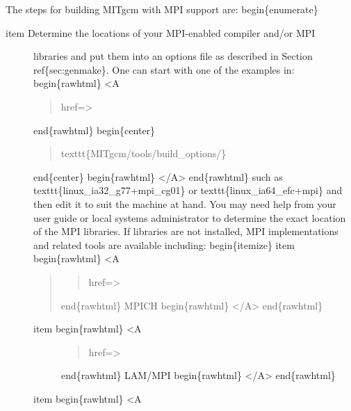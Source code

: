 \documentclass[letterpaper,10pt,english]{sphinxmanual}
\begin{document}
The steps for building MITgcm with MPI support are:
begin\{enumerate\}
\begin{description}
\item[{item Determine the locations of your MPI-enabled compiler and/or MPI}] \leavevmode
libraries and put them into an options file as described in Section
ref\{sec:genmake\}.  One can start with one of the examples in:
begin\{rawhtml\} \textless{}A
\begin{quote}

href=\sphinxquotedblright{}\sphinxquotedblleft{}\textgreater{}
\end{quote}

end\{rawhtml\}
begin\{center\}
\begin{quote}

texttt\{MITgcm/tools/build\_options/\}
\end{quote}

end\{center\}
begin\{rawhtml\} \textless{}/A\textgreater{} end\{rawhtml\}
such as texttt\{linux\_ia32\_g77+mpi\_cg01\} or
texttt\{linux\_ia64\_efc+mpi\} and then edit it to suit the machine at
hand.  You may need help from your user guide or local systems
administrator to determine the exact location of the MPI libraries.
If libraries are not installed, MPI implementations and related
tools are available including:
begin\{itemize\}
item begin\{rawhtml\} \textless{}A
\begin{quote}
\begin{quote}

href=\sphinxquotedblright{}\sphinxquotedblleft{}\textgreater{}
\end{quote}

end\{rawhtml\}
MPICH
begin\{rawhtml\} \textless{}/A\textgreater{} end\{rawhtml\}
\end{quote}
\begin{description}
\item[{item begin\{rawhtml\} \textless{}A}] \leavevmode\begin{quote}

href=\sphinxquotedblright{}\sphinxquotedblleft{}\textgreater{}
\end{quote}

end\{rawhtml\}
LAM/MPI
begin\{rawhtml\} \textless{}/A\textgreater{} end\{rawhtml\}

\item[{item begin\{rawhtml\} \textless{}A}] \leavevmode\begin{quote}


\end{quote}
\end{description}
\end{description}
\end{document}

